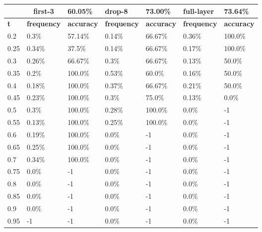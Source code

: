 
\begin{table}[t]
\centering
\begin{tabular}{lllllll}
\hline
\multicolumn{1}{c}{} & \multicolumn{1}{c}{first-3} & \multicolumn{1}{l|}{60.05\%} & drop-8 & \multicolumn{1}{l|}{73.00\%} & full-layer & 73.64\% \\ \hline
\multicolumn{1}{l|}{\textbf{t}} & \textbf{frequency} & \multicolumn{1}{l|}{\textbf{accuracy}} & \textbf{frequency} & \multicolumn{1}{l|}{\textbf{accuracy}} & \textbf{frequency} & \textbf{accuracy} \\ \hline	\multicolumn{1}{l|}{0.2}&  0.3\% & \multicolumn{1}{l|}{57.14\%}& 0.14\% & \multicolumn{1}{l|}{66.67\%}& 0.36\% & 100.0\%\\ 
\multicolumn{1}{l|}{0.25}&  0.34\% & \multicolumn{1}{l|}{37.5\%}& 0.14\% & \multicolumn{1}{l|}{66.67\%}& 0.17\% & 100.0\%\\ 
\multicolumn{1}{l|}{0.3}&  0.26\% & \multicolumn{1}{l|}{66.67\%}& 0.3\% & \multicolumn{1}{l|}{66.67\%}& 0.13\% & 50.0\%\\ 
\multicolumn{1}{l|}{0.35}&  0.2\% & \multicolumn{1}{l|}{100.0\%}& 0.53\% & \multicolumn{1}{l|}{60.0\%}& 0.16\% & 50.0\%\\ 
\multicolumn{1}{l|}{0.4}&  0.18\% & \multicolumn{1}{l|}{100.0\%}& 0.37\% & \multicolumn{1}{l|}{66.67\%}& 0.21\% & 50.0\%\\ 
\multicolumn{1}{l|}{0.45}&  0.23\% & \multicolumn{1}{l|}{100.0\%}& 0.3\% & \multicolumn{1}{l|}{75.0\%}& 0.13\% & 0.0\%\\ 
\multicolumn{1}{l|}{0.5}&  0.3\% & \multicolumn{1}{l|}{100.0\%}& 0.28\% & \multicolumn{1}{l|}{100.0\%}& 0.0\% & -1\\ 
\multicolumn{1}{l|}{0.55}&  0.13\% & \multicolumn{1}{l|}{100.0\%}& 0.25\% & \multicolumn{1}{l|}{100.0\%}& 0.0\% & -1\\ 
\multicolumn{1}{l|}{0.6}&  0.19\% & \multicolumn{1}{l|}{100.0\%}& 0.0\% & \multicolumn{1}{l|}{-1}& 0.0\% & -1\\ 
\multicolumn{1}{l|}{0.65}&  0.25\% & \multicolumn{1}{l|}{100.0\%}& 0.0\% & \multicolumn{1}{l|}{-1}& 0.0\% & -1\\ 
\multicolumn{1}{l|}{0.7}&  0.34\% & \multicolumn{1}{l|}{100.0\%}& 0.0\% & \multicolumn{1}{l|}{-1}& 0.0\% & -1\\ 
\multicolumn{1}{l|}{0.75}&  0.0\% & \multicolumn{1}{l|}{-1}& 0.0\% & \multicolumn{1}{l|}{-1}& 0.0\% & -1\\ 
\multicolumn{1}{l|}{0.8}&  0.0\% & \multicolumn{1}{l|}{-1}& 0.0\% & \multicolumn{1}{l|}{-1}& 0.0\% & -1\\ 
\multicolumn{1}{l|}{0.85}&  0.0\% & \multicolumn{1}{l|}{-1}& 0.0\% & \multicolumn{1}{l|}{-1}& 0.0\% & -1\\ 
\multicolumn{1}{l|}{0.9}&  0.0\% & \multicolumn{1}{l|}{-1}& 0.0\% & \multicolumn{1}{l|}{-1}& 0.0\% & -1\\ 
\multicolumn{1}{l|}{0.95}&  -1 & \multicolumn{1}{l|}{-1}& 0.0\% & \multicolumn{1}{l|}{-1}& 0.0\% & -1\\ 


\end{tabular}
\end{table}
